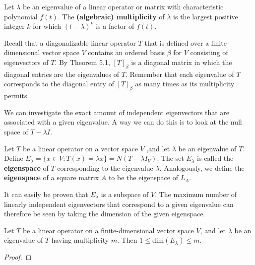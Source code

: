 \begin{definition}
    Let \( \lambda  \) be an eigenvalue of a linear operator or matrix with characteristic polynomial \( f(t) \). The \textbf{(algebraic) multiplicity} of \( \lambda  \) is the largest positive integer \( k  \) for which \( (t- \lambda)^{k }  \) is a factor of \( f(t) \).
\end{definition}

Recall that a diagonalizable linear operator \( T  \) that is defined over a finite-dimensional vector space \( V  \) contains an ordered basis \( \beta \) for \( V \) consisting of eigenvectors of \( T  \). By Theorem 5.1, \( [T]_{\beta} \) is a diagonal matrix in which the diagonal entries are the eigenvalues of \( T  \). Remember that each eigenvalue of \( T  \) corresponds to the diagonal entry of \( [T]_{\beta} \) as many times as its multiplicity permits. 

We can investigate the exact amount of independent eigenvectors that are associated with a given eigenvalue. A way we can do this is to look at the null space of \( T - \lambda I  \).

\begin{definition}[Eigenspace]
    Let \( T  \) be a linear operator on a vector space \( V  \) ,and let \( \lambda  \) be an eigenvalue of \( T  \). Define \( {E}_{\lambda} = \{ x \in V : T(x) = \lambda x \}  =  N(T - \lambda {I}_{V}) \). The set \( {E}_{\lambda} \) is called the \textbf{eigenspace} of \( T  \) corresponding to the eigenvalue \( \lambda  \). Analogously, we define the \textbf{eigenspace} of a square matrix \( A  \) to be the eigenspace of \( {L}_{A} \).
\end{definition}

It can easily be proven that \( {E}_{\lambda} \) is a subspace of \( V  \). The maximum number of linearly independent eigenvectors that correspond to a given eigenvalue can therefore be seen by taking the dimension of the given eigenspace.

\begin{theorem}
    Let \( T  \) be a linear operator on a finite-dimensional vector space \( V  \), and let \( \lambda  \) be an eigenvalue of \( T  \) having multiplicity \(  m  \). Then \( 1 \leq \text{dim}({E}_{\lambda}) \leq  m \).
\end{theorem} 
\begin{proof}

\end{proof}


